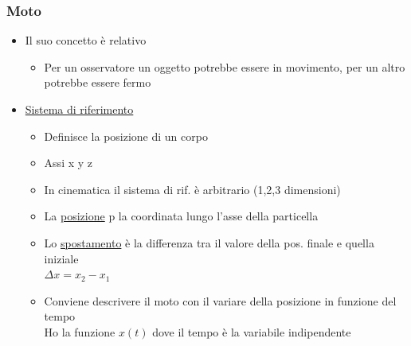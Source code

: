 \documentclass{report}
\begin{document}
\subsubsection{Moto}
\begin{itemize}
  \item Il suo concetto è relativo
        \begin{itemize}
          \item Per un osservatore un oggetto potrebbe essere in movimento, per un altro potrebbe essere fermo
        \end{itemize}
  \item \underline{Sistema di riferimento}
        \begin{itemize}
          \item Definisce la posizione di un corpo
          \item Assi x y z
          \item In cinematica il sistema di rif. è arbitrario (1,2,3 dimensioni)
          \item La \underline{posizione} p la coordinata lungo l'asse della particella
          \item Lo \underline{spostamento} è la differenza tra il valore della pos. finale e quella iniziale\\$\Delta x=x_2-x_1$
          \item Conviene descrivere il moto con il variare della posizione in funzione del tempo\\Ho la funzione $x(t)$ dove il tempo è la variabile indipendente\\
\end{itemize}
\end{itemize}
\end{document}
